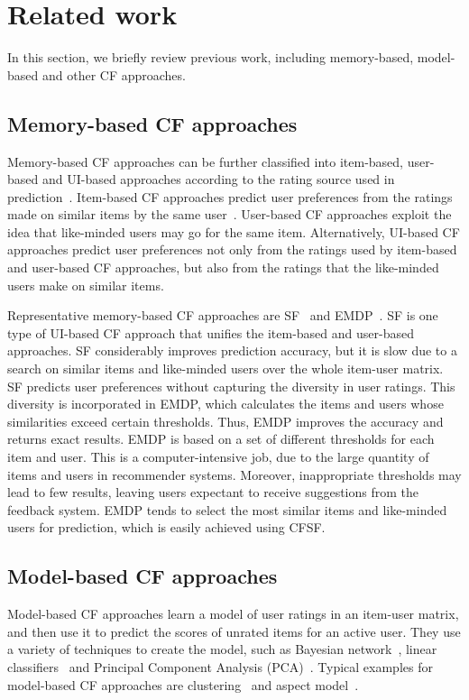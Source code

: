 \section{Related work}\label{sec:related}
In this section, we briefly review previous work, including
memory-based, model-based and other CF approaches.

\subsection{Memory-based CF approaches}
Memory-based CF approaches can be further classified into item-based,
user-based and UI-based approaches according to the rating source used
in prediction~\cite{Xuegr:CF@2005, Sarwar:WWW01@2001}. Item-based CF
approaches predict user preferences from the ratings made on similar
items by the same user~\cite{Linden:Amazon@2003}. User-based CF
approaches exploit the idea that like-minded users may go for the same
item. Alternatively, UI-based CF approaches predict user preferences
not only from the ratings used by item-based and user-based CF
approaches, but also from the ratings that the like-minded users make
on similar items.

Representative memory-based CF approaches are SF~\cite{wangjun:CF@2006}
and EMDP~\cite{Ma2007@SIGIR}. SF is one type of UI-based CF approach
that unifies the item-based and user-based approaches. SF considerably
improves prediction accuracy, but it is slow due to a search on similar
items and like-minded users over the whole item-user matrix. SF
predicts user preferences without capturing the diversity in user
ratings. This diversity is incorporated in EMDP, which calculates the
items and users whose similarities exceed certain thresholds. Thus,
EMDP improves the accuracy and returns exact results. EMDP is based on
a set of different thresholds for each item and user. This is a
computer-intensive job, due to the large quantity of items and users in
recommender systems. Moreover, inappropriate thresholds may lead to few
results, leaving users expectant to receive suggestions from the
feedback system. EMDP tends to select the most similar items and
like-minded users for prediction, which is easily achieved using CFSF.

\subsection{Model-based CF approaches}
Model-based CF approaches learn a model of user ratings in an item-user
matrix, and then use it to predict the scores of unrated items for an
active user. They use a variety of techniques to create the model, such
as Bayesian network~\cite{Zhang:Bayes@2007}, linear
classifiers~\cite{Tong@JMLR2002} and Principal Component Analysis
(PCA)~\cite{Linden:Amazon@2003}. Typical examples for model-based CF
approaches are clustering~\cite{Connor:SIGIR@01} and aspect
model~\cite{cheung:extendedLSM@2004}.

